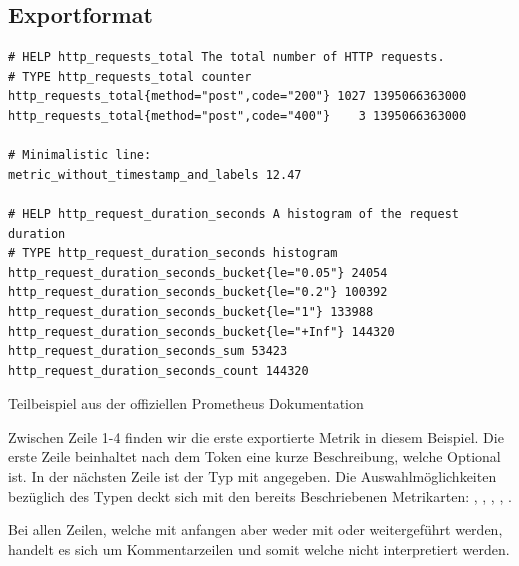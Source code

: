 \subsection{Exportformat}
\begin{listing}[h]
\begin{verbatim}
# HELP http_requests_total The total number of HTTP requests.
# TYPE http_requests_total counter
http_requests_total{method="post",code="200"} 1027 1395066363000
http_requests_total{method="post",code="400"}    3 1395066363000

# Minimalistic line:
metric_without_timestamp_and_labels 12.47

# HELP http_request_duration_seconds A histogram of the request duration
# TYPE http_request_duration_seconds histogram
http_request_duration_seconds_bucket{le="0.05"} 24054
http_request_duration_seconds_bucket{le="0.2"} 100392
http_request_duration_seconds_bucket{le="1"} 133988
http_request_duration_seconds_bucket{le="+Inf"} 144320
http_request_duration_seconds_sum 53423
http_request_duration_seconds_count 144320
\end{verbatim}
\caption{Teilbeispiel aus der offiziellen Prometheus Dokumentation~\cite{PrometheusExpositionFormatBeispiel}}
\end{listing}

Zwischen Zeile 1-4 finden wir die erste exportierte Metrik in diesem Beispiel. Die erste Zeile beinhaltet nach dem Token  eine kurze Beschreibung, welche Optional ist. In der nächsten Zeile ist der Typ mit\linebreak {} angegeben. Die Auswahlmöglichkeiten bezüglich des Typen deckt sich mit den bereits Beschriebenen Metrikarten: , , , , .

Bei allen Zeilen, welche mit \promcode{#} anfangen aber weder mit  oder  weitergeführt werden, handelt es sich um Kommentarzeilen und somit welche nicht interpretiert werden.

